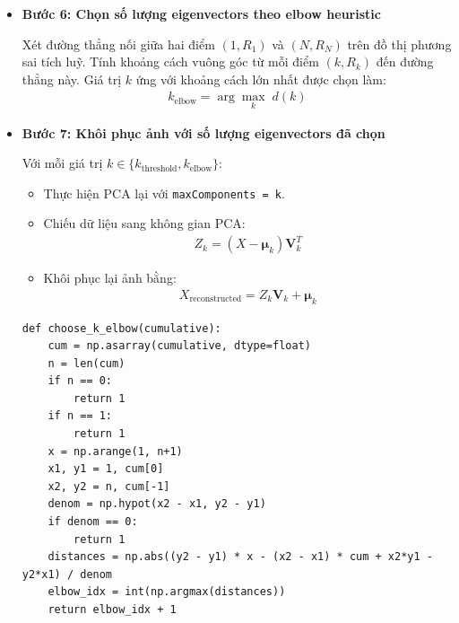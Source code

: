 \begin{itemize}
                    Tìm số lượng thành phần chính nhỏ nhất $k_{\text{threshold}}$ thoả mãn:
                    \begin{align}
                        R_{k_{\text{threshold}}} \ge \text{threshold}
                    \end{align}
                    với \texttt{threshold} được lựa chọn trước (ví dụ $0.9$ hoặc $0.95$).
                    \begin{lstlisting}
def choose_k_by_threshold(cumulative, threshold=0.95):
    k = int(np.searchsorted(cumulative, threshold) + 1)
    if k < 1:
        k = 1
    if k > len(cumulative):
        k = len(cumulative)
    return k
                    \end{lstlisting}
                \item \textbf{Bước 6: Chọn số lượng eigenvectors theo elbow heuristic}

                Xét đường thẳng nối giữa hai điểm $(1, R_1)$ và $(N, R_N)$ trên đồ thị phương sai tích luỹ.
                Tính khoảng cách vuông góc từ mỗi điểm $(k, R_k)$ đến đường thẳng này.
                Giá trị $k$ ứng với khoảng cách lớn nhất được chọn làm:
                \begin{align}
                    k_{\text{elbow}} = \arg\max_k \; d(k)
                \end{align}

                \item \textbf{Bước 7: Khôi phục ảnh với số lượng eigenvectors đã chọn}

                Với mỗi giá trị $k \in \{k_{\text{threshold}}, k_{\text{elbow}}\}$:
                \begin{itemize}
                    \item Thực hiện PCA lại với \texttt{maxComponents = k}.
                    \item Chiếu dữ liệu sang không gian PCA:
                    \begin{align}
                        Z_k = (X - \boldsymbol{\mu}_k)\mathbf{V}_k^T
                    \end{align}
                    \item Khôi phục lại ảnh bằng:
                    \begin{align}
                        X_{\text{reconstructed}} = Z_k \mathbf{V}_k + \boldsymbol{\mu}_k
                    \end{align}
                \end{itemize}
                \begin{lstlisting}
def choose_k_elbow(cumulative):
    cum = np.asarray(cumulative, dtype=float)
    n = len(cum)
    if n == 0:
        return 1
    if n == 1:
        return 1
    x = np.arange(1, n+1)
    x1, y1 = 1, cum[0]
    x2, y2 = n, cum[-1]
    denom = np.hypot(x2 - x1, y2 - y1)
    if denom == 0:
        return 1
    distances = np.abs((y2 - y1) * x - (x2 - x1) * cum + x2*y1 - y2*x1) / denom
    elbow_idx = int(np.argmax(distances))
    return elbow_idx + 1
                \end{lstlisting}


\end{itemize}
